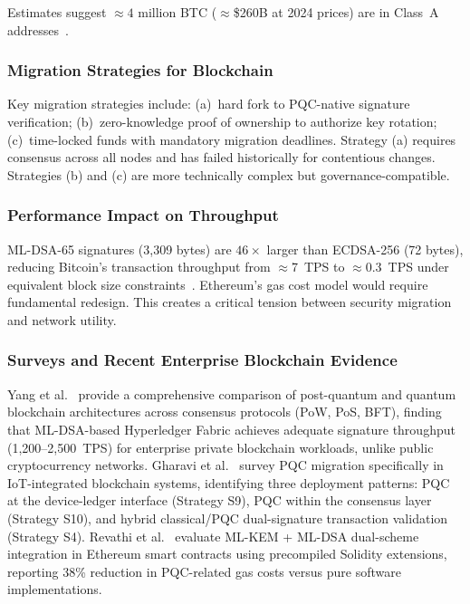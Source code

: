 \documentclass[journal]{IEEEtran}
\begin{document}
Estimates suggest $\approx 4$ million BTC ($\approx$\$260B at 2024 prices)
are in Class~A addresses~\cite{fernandezcarames2020review}.

\subsubsection{Migration Strategies for Blockchain}

Key migration strategies include: (a)~hard fork to PQC-native signature
verification; (b)~zero-knowledge proof of ownership to authorize key rotation;
(c)~time-locked funds with mandatory migration deadlines. Strategy (a) requires
consensus across all nodes and has failed historically for contentious changes.
Strategies (b) and (c) are more technically complex but governance-compatible.

\subsubsection{Performance Impact on Throughput}

ML-DSA-65 signatures (3,309 bytes) are $46\times$ larger than ECDSA-256 (72 bytes),
reducing Bitcoin's transaction throughput from $\approx$7~TPS to $\approx$0.3~TPS
under equivalent block size constraints~\cite{chen2021blockchain}. Ethereum's
gas cost model would require fundamental redesign. This creates a critical
tension between security migration and network utility.

\subsubsection{Surveys and Recent Enterprise Blockchain Evidence}

Yang et al.~\cite{yang2024survey} provide a comprehensive comparison of
post-quantum and quantum blockchain architectures across consensus protocols
(PoW, PoS, BFT), finding that ML-DSA-based Hyperledger Fabric achieves
adequate signature throughput (1,200--2,500~TPS) for enterprise private
blockchain workloads, unlike public cryptocurrency networks. Gharavi et
al.~\cite{gharavi2024postquantum} survey PQC migration specifically in
IoT-integrated blockchain systems, identifying three deployment patterns:
PQC at the device-ledger interface (Strategy S9), PQC within the consensus
layer (Strategy S10), and hybrid classical/PQC dual-signature transaction
validation (Strategy S4). Revathi et al.~\cite{revathi2025enhancing} evaluate
ML-KEM + ML-DSA dual-scheme integration in Ethereum smart contracts using
precompiled Solidity extensions, reporting 38\% reduction in PQC-related gas
costs versus pure software implementations.
\end{document}
